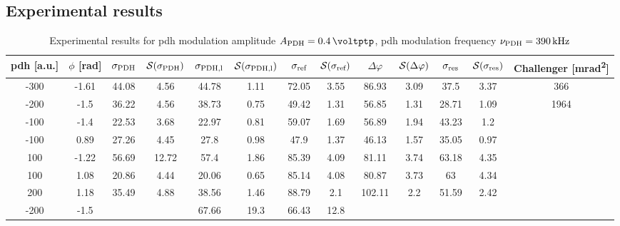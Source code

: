 \begin{landscape}
	\chapter{Experimental results}
	
	
	\begin{table}
	\centering
	\begin{tabular}{|c|c|c|c|c|c|c|c|c|c|c|c|c|}
		\hline
		\gls{pdh} [a.u.] & $\phi$ [\si{\radian}] & $\sigma_{\text{PDH}}$ & $\mathcal{S}(\sigma_{\text{PDH}})$ & $\sigma_{\text{PDH,l}}$ & $\mathcal{S}(\sigma_{\text{PDH,l}})$  & $\sigma_{\text{ref}}$ & $\mathcal{S}(\sigma_{\text{ref}})$ & $\Delta \varphi$ & $\mathcal{S}(\Delta \varphi)$ & $\sigma_{\text{res}}$  & $\mathcal{S}(\sigma_{\text{res}})$ & Challenger [\si{\milli\radian\squared}] \\
		\hline
		\hline
		-300 & -1.61 & 44.08 & 4.56 & 44.78 & 1.11 & 72.05 & 3.55 & 86.93 & 3.09 & 37.5 & 3.37 & 366\\
		-200 & -1.5 & 36.22 & 4.56 & 38.73 & 0.75 & 49.42 & 1.31 & 56.85 & 1.31 & 28.71 & 1.09 & 1964\\
		-100 & -1.4 & 22.53 & 3.68 & 22.97 & 0.81 & 59.07 & 1.69 & 56.89 & 1.94 & 43.23 & 1.2 & \\
		-100 & 0.89 & 27.26 & 4.45 & 27.8 & 0.98 & 47.9 & 1.37 & 46.13 & 1.57 & 35.05 & 0.97 & \\
		100 & -1.22 & 56.69 & 12.72 & 57.4 & 1.86 & 85.39 & 4.09 & 81.11 & 3.74 & 63.18 & 4.35 & \\
		100 & 1.08 & 20.86 & 4.44 & 20.06 & 0.65 & 85.14 & 4.08 & 80.87 & 3.73 & 63 & 4.34 & \\
		200 & 1.18 & 35.49 & 4.88 & 38.56 & 1.46 & 88.79 & 2.1 & 102.11 & 2.2 & 51.59 & 2.42 & \\
		\hline
		\hline
		-200 & -1.5 & & & 67.66 & 19.3 & 66.43 & 12.8 & & & & & \\
		\hline
	\end{tabular}
	\caption{Experimental results for \gls{pdh} modulation amplitude $\tind{A}{PDH} = \SI{0.4}{\voltptp}$, \gls{pdh} modulation frequency $\nu_{\text{PDH}} = \SI{390}{\kilo\hertz}$}
	\end{table}
	
	

\end{landscape}
